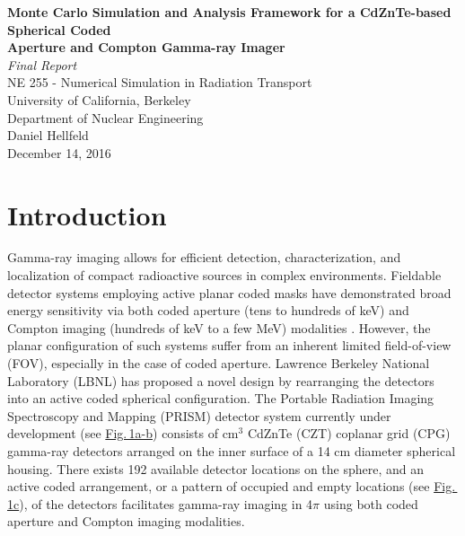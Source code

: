 \documentclass[10pt]{article}
\begin{document}
\begin{centering}
\textbf{Monte Carlo Simulation and Analysis Framework for a CdZnTe-based Spherical Coded\\[-5pt] Aperture and Compton Gamma-ray Imager}\\
\vspace{5pt}
\emph{Final Report}\\
\vspace{5pt}
NE 255 - Numerical Simulation in Radiation Transport \\[-5pt]
University of California, Berkeley \\[-5pt]
Department of Nuclear Engineering\\
\vspace{5pt}
Daniel Hellfeld\\
\vspace{5pt}
December 14, 2016 \\
\end{centering}


\section{Introduction}

Gamma-ray imaging allows for efficient detection, characterization, and localization of compact radioactive sources in complex environments. Fieldable detector systems employing active planar coded masks have demonstrated broad energy sensitivity via both coded aperture (tens to hundreds of keV) and Compton imaging (hundreds of keV to a few MeV) modalities \cite{Galloway2011}. However, the planar configuration of such systems suffer from an inherent limited field-of-view (FOV), especially in the case of coded aperture. Lawrence Berkeley National Laboratory (LBNL) has proposed a novel design by rearranging the detectors into an active coded spherical configuration. The Portable Radiation Imaging Spectroscopy and Mapping (PRISM) detector system currently under development (see \hyperlink{fig1}{Fig.\,1a-b}) consists of cm$^3$ CdZnTe (CZT) coplanar grid (CPG) \cite{Luke1995} gamma-ray detectors arranged on the inner surface of a 14 cm diameter spherical housing. There exists 192 available detector locations on the sphere, and an active coded arrangement, or a pattern of occupied and empty locations (see \hyperlink{fig1}{Fig.\,1c}), of the detectors facilitates gamma-ray imaging in 4$\pi$ using both coded aperture and Compton imaging modalities.
\end{document}
